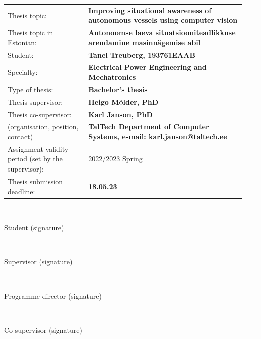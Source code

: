 \begin{flushleft}
\renewcommand{\arraystretch}{1.3}
\begin{tabular}{@{}p{0.32\linewidth}p{0.62\linewidth}@{}}
\hline
Thesis topic:                                                 & \textbf{Improving situational awareness of autonomous vessels using computer vision} \\
Thesis topic in Estonian:                                     & \textbf{Autonoomse laeva situatsiooniteadlikkuse arendamine masinnägemise abil} \\
Student:                                                      & \textbf{Tanel Treuberg, 193761EAAB} \\
Specialty:                                                    & \textbf{Electrical Power Engineering and Mechatronics} \\
Type of thesis:                                               & \textbf{Bachelor's thesis} \\
Thesis supervisor:                                            & \textbf{Heigo Mõlder, PhD} \\
Thesis co-supervisor:                                         & \textbf{Karl Janson, PhD} \\
(organisation, position, contact)                             & \textbf{TalTech Department of Computer Systems, e-mail: karl.janson@taltech.ee} \\
Assignment validity period (set by the supervisor):           & 2022/2023 Spring \\
Thesis submission deadline:                                   & \textbf{18.05.23} \\
\hline
\end{tabular}
\end{flushleft}

\vspace{1.5em}

\begin{minipage}{\linewidth}
\noindent\rule{6cm}{0.4pt}\\
Student (signature)

\noindent\rule{6cm}{0.4pt}\\
Supervisor (signature)

\noindent\rule{6cm}{0.4pt}\\
Programme director (signature)

\noindent\rule{6cm}{0.4pt}\\
Co-supervisor (signature)
\end{minipage}

